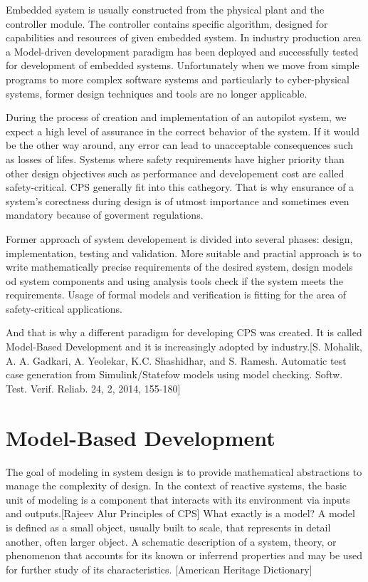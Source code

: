 Embedded system is usually constructed from the physical plant and the controller module. The controller contains specific algorithm, designed for capabilities and resources of given embedded system. In industry production area a Model-driven development paradigm has been deployed and successfully tested for development of embedded systems. Unfortunately when we move from simple programs to more complex software systems and particularly to cyber-physical systems, former design techniques and tools are no longer applicable.

During the process of creation and implementation of an autopilot system, we expect a high level of assurance in the correct behavior of the system. If it would be the other way around, any error can lead to unacceptable consequences such as losses of lifes. Systems where safety requirements have higher priority than other design objectives such as performance and developement cost are called safety-critical. CPS generally fit into this cathegory. That is why ensurance of a system's corectness during design is of utmost importance and sometimes even mandatory because of goverment regulations.


Former approach of system developement is divided into several phases: design, implementation, testing and validation. More suitable and practial approach is to write mathematically precise requirements of the desired system, design models od system components and using analysis tools check if the system meets the requirements. Usage of formal models and verification is fitting for the area of safety-critical applications. 

And that is why a different paradigm for developing CPS was created. It is called Model-Based Development and it is increasingly adopted by industry.[S. Mohalik, A. A. Gadkari, A. Yeolekar, K.C. Shashidhar, and S. Ramesh. Automatic test case generation from Simulink/Statefow models using model checking. Softw. Test. Verif. Reliab. 24, 2, 2014, 155-180]

\section{Model-Based Development}

The goal of modeling in system design is to provide mathematical abstractions to manage the complexity of design. In the context of reactive systems, the basic unit of modeling is a component that interacts with its environment via inputs and outputs.[Rajeev Alur Principles of CPS] What exactly is a model? A model is defined as a small object, usually built to scale, that represents in detail another, often larger object. A schematic description of a system, theory, or phenomenon that accounts for its known or inferrend properties and may be used for further study of its characteristics. [American Heritage Dictionary]

